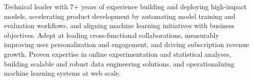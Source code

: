 
Technical leader with 7+ years of experience building and deploying high-impact models, accelerating product development by automating model training and evaluation workflows, and aligning machine learning initiatives with business objectives. Adept at leading cross-functional collaborations, measurably improving user personalization and engagement, and driving subscription revenue growth. Proven expertise in online experimentation and statistical analyses, building scalable and robust data engineering solutions, and operationalizing machine learning systems at web scale.

